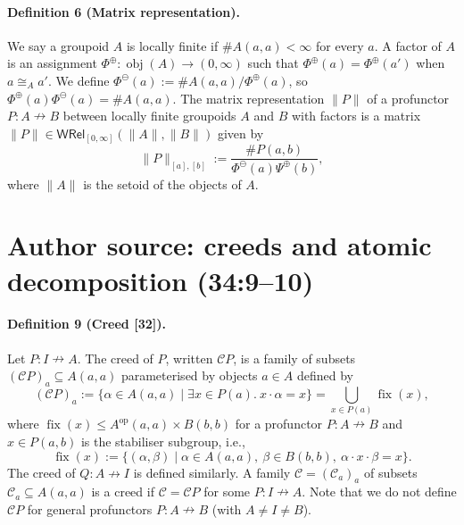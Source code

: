 \documentclass[10pt,a4paper]{article}
\newcommand{\pf}{\mathrel{\nrightarrow}}
\newcommand{\norm}[1]{\lVert#1\rVert}
\newcommand{\WRel}{\mathsf{WRel}_{[0,\infty]}}
\begin{document}
\paragraph{Definition 6 (Matrix representation).}
We say a groupoid $A$ is locally finite if $\#A(a,a)<\infty$ for every $a$. A factor of $A$ is an assignment $\Phi^\oplus:\operatorname{obj}(A)\to(0,\infty)$ such that $\Phi^\oplus(a)=\Phi^\oplus(a')$ when $a\cong_A a'$. We define $\Phi^\ominus(a):=\#A(a,a)/\Phi^\oplus(a)$, so $\Phi^\oplus(a)\Phi^\ominus(a)=\#A(a,a)$.
The matrix representation $\norm P$ of a profunctor $P:A\pf B$ between locally finite groupoids $A$ and $B$ with factors is a matrix $\norm P\in\WRel(\norm A,\norm B)$ given by
\begin{equation}
\norm P_{[a],[b]}:=\frac{\#P(a,b)}{\Phi^\ominus(a)\Psi^\oplus(b)},\tag{2}
\end{equation}
where $\norm A$ is the setoid of the objects of $A$.
\section*{Author source: creeds and atomic decomposition (34:9--10)}
\paragraph{Definition 9 (Creed [32]).}
Let $P:I\pf A$. The creed of $P$, written $\mathcal CP$, is a family of subsets $(\mathcal CP)_a\subseteq A(a,a)$ parameterised by objects $a\in A$ defined by
\[
(\mathcal CP)_a:=\{\alpha\in A(a,a)\mid\exists x\in P(a).\ x\cdot\alpha=x\}
=\bigcup_{x\in P(a)}\operatorname{fix}(x),
\]
where $\operatorname{fix}(x)\le A^{\mathrm{op}}(a,a)\times B(b,b)$ for a profunctor $P:A\pf B$ and $x\in P(a,b)$ is the stabiliser subgroup, i.e.,
\[
\operatorname{fix}(x):=\{(\alpha,\beta)\mid\alpha\in A(a,a),\ \beta\in B(b,b),\ \alpha\cdot x\cdot\beta=x\}.
\]
The creed of $Q:A\pf I$ is defined similarly. A family $\mathcal C=(\mathcal C_a)_a$ of subsets $\mathcal C_a\subseteq A(a,a)$ is a creed if $\mathcal C=\mathcal CP$ for some $P:I\pf A$.
Note that we do not define $\mathcal CP$ for general profunctors $P:A\pf B$ (with $A\ne I\ne B$).
\end{document}
